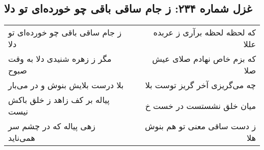 \begin{center}
\section*{غزل شماره ۲۳۴: ز جام ساقی باقی چو خورده‌ای تو دلا}
\label{sec:0234}
\begin{longtable}{l p{0.5cm} r}
ز جام ساقی باقی چو خورده‌ای تو دلا
&&
که لحظه لحظه برآری ز عربده عللا
\\
مگر ز زهره شنیدی دلا به وقت صبوح
&&
که بزم خاص نهادم صلای عیش صلا
\\
بلا درست بلایش بنوش و در می‌بار
&&
چه می‌گریزی آخر گریز توست بلا
\\
پیاله بر کف زاهد ز خلق باکش نیست
&&
میان خلق نشستست در خست خ
\\
زهی پیاله که در چشم سر همی‌ناید
&&
ز دست ساقی معنی تو هم بنوش هلا
\\
\end{longtable}
\end{center}
